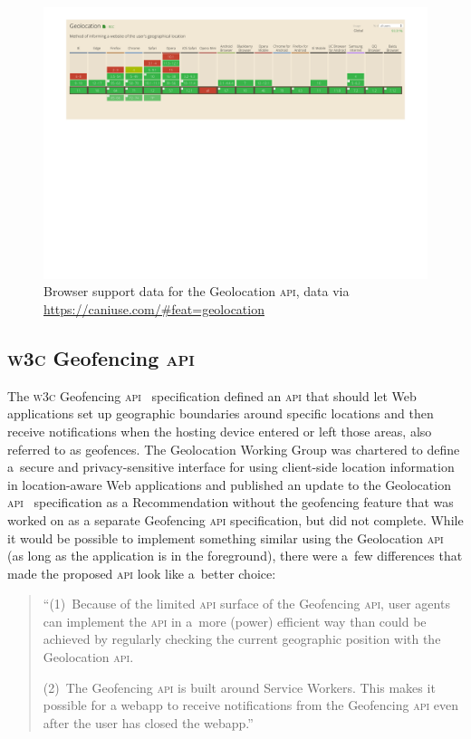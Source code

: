 \documentclass[sigconf,hyphens]{acmart}
\begin{document}
\begin{figure}[h]
  \includegraphics[width=\linewidth,trim=2.5cm 17.5cm 2.5cm 0cm]{caniuse.pdf}
  \caption{Browser support data for the Geolocation \textsc{api},
    data via \url{https://caniuse.com/\#feat=geolocation}}
  \label{fig:caniuse}
\end{figure}

\subsection{\textsc{w3c} Geofencing \textsc{api}}

The \textsc{w3c} Geofencing \textsc{api}~\cite{kruisselbrink2017geofencing} specification
defined an \textsc{api} that should let Web applications set up geographic boundaries
around specific locations and then receive notifications when the hosting device
entered or left those areas, also referred to as geofences.
The Geolocation Working Group was chartered to define a~secure and privacy-sensitive interface
for using client-side location information in location-aware Web applications
and published an update to the Geolocation \textsc{api}~\cite{popescu2016geolocation}
specification as a Recommendation without the geofencing feature
that was worked on as a separate Geofencing \textsc{api} specification, but did not complete.
While it would be possible to implement something similar using the Geolocation \textsc{api}
(as long as the application is in the foreground),
there were a~few differences that made the proposed \textsc{api} look like a~better choice:

\begin{quote}
``(1)~Because of the limited \textsc{api} surface of the Geofencing \textsc{api},
user agents can implement the \textsc{api} in a~more (power) efficient way
than could be achieved by regularly checking the current geographic position with the Geolocation \textsc{api}.

(2)~The Geofencing \textsc{api} is built around Service Workers.
This makes it possible for a webapp to receive notifications from the Geofencing \textsc{api}
even after the user has closed the webapp.''	
\end{quote}
\end{document}
